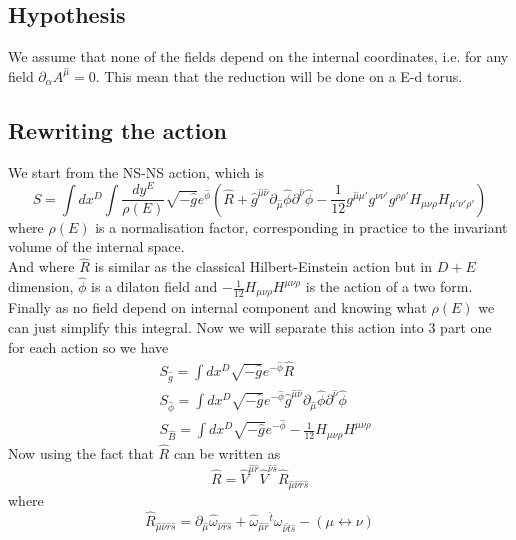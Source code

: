 \documentclass{article}
\begin{document}
\subsection{Hypothesis}
We assume that none of the fields depend on the internal coordinates, i.e. for any field $\partial_\alpha A^{\hat \mu} = 0$. This mean that the reduction will be done on a E-d torus.
\subsection{Rewriting the action}
We start from the NS-NS action, which is 
\begin{equation} \label{NS-NSaction}
    \boxed{S = \int d x^D \int \frac{d y ^E}{\rho(E)}\sqrt{- \hat g } e^{\hat \phi} (\hat R +  \hat g^{\hat \mu \hat \nu}\partial_{\hat \mu}\hat \phi \partial^{\hat \nu}\hat \phi - \frac{1}{12} g^{ \hat \mu  \mu'} g^{\nu \nu'} g^{\rho \rho'} H_{ \mu \nu \rho}H_{ \mu'\nu' \rho'})}
\end{equation}
where $\rho(E)$ is a normalisation factor, corresponding in practice to the invariant volume of the internal space.\\
And where $\hat R$ is similar as the classical Hilbert-Einstein action but in $D+E$ dimension, $\hat \phi$ is a dilaton field and $- \frac{1}{12} H_{ \mu \nu \rho}H^{ \mu\nu \rho}$ is the  action of a two form.
Finally as no field depend on internal component and knowing what $\rho(E)$ we can just simplify this integral.
Now we will separate this action into 3 part one for each action so we have
\begin{subequations}
    \begin{align}
        &S_{\hat g} = \int d x^D\sqrt{- \hat g } e^{-\hat \phi} \hat R \label{Sg}\\ 
        &S_{\hat \phi} =  \int d x^D \sqrt{- \hat g } e^{-\hat \phi} \hat g^{\hat \mu \hat \nu}\partial_{\hat \mu}\hat \phi \partial^{\hat \nu}\hat \phi \label{Sphi}\\ 
        &S_{\hat B} =  \int d x^D \sqrt{- \hat g } e^{-\hat \phi} - \frac{1}{12} H_{ \mu \nu \rho}H^{ \mu\nu \rho} \label{SB}
    \end{align}
\end{subequations}
Now using the fact that $\hat R$ can be written as
\begin{equation*} \label{Ricciexp}
    \hat R = \hat V^{\hat \mu \hat r} \hat V^{\hat \nu \hat s} \hat R_{\hat \mu \hat \nu \hat r \hat s}
\end{equation*}
where 
\begin{equation*} \label{expriemann}
    \hat R_{\hat \mu \hat \nu \hat r \hat s} =  \partial_{\hat \mu } \hat \omega_{\hat \nu \hat r \hat s}+ \hat \omega_{\hat\mu \hat r}{}^{\hat t}\omega_{\hat\nu \hat t \hat s} - (\mu \leftrightarrow \nu)
\end{equation*}
\end{document}
